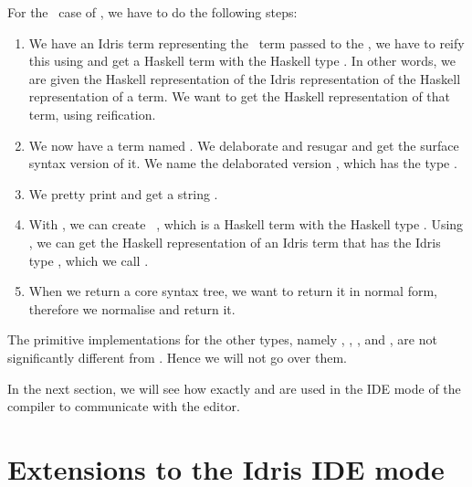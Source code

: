 

For the \TT\ case of , we have to do the following steps:
\begin{enumerate}
  \item We have an Idris term  representing the \TT\ term passed to
    the , we have to reify this using  and
    get a Haskell term with the Haskell type .
    In other words, we are given the Haskell representation of the Idris
    representation of the Haskell representation of a term.
    We want to get the Haskell representation of that term, using reification.
  \item We now have a  term named . We delaborate and resugar
     and get the surface syntax version of it. We name the delaborated
    version , which has the type .
  \item We pretty print  and get a string .
  \item With , we can create \texttt{ }, which is a
    Haskell term with the Haskell type . Using , we
    can get the Haskell representation of an Idris term that has the Idris type
    , which we call .
  \item When we return a core syntax tree, we want to return it in normal form,
    therefore we normalise  and return it.
\end{enumerate}

The primitive implementations for the other types, namely ,
, , and , are not significantly
different from . Hence we will not go over them.

In the next section, we will see how exactly  and 
are used in the IDE mode of the compiler to communicate with the editor.


\section{Extensions to the Idris IDE mode}\label{sec:idemode}
